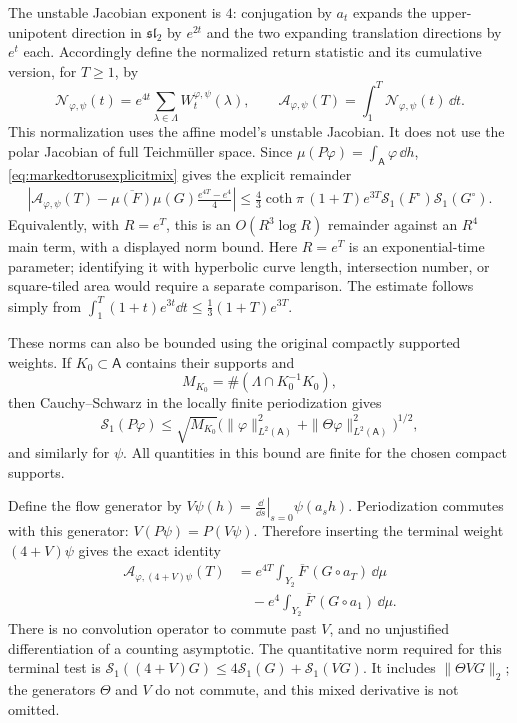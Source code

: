The unstable Jacobian exponent is $4$: conjugation by $a_t$
expands the upper-unipotent direction in $\mathfrak{sl}_2$ by
$e^{2t}$ and the two expanding translation directions by $e^t$
each. Accordingly define the normalized return statistic and its
cumulative version, for $T\geq1$, by
\[
 \mathcal N_{\varphi,\psi}(t)
   =e^{4t}\sum_{\lambda\in\Lambda}
                     W_t^{\varphi,\psi}(\lambda),\qquad
 \mathcal A_{\varphi,\psi}(T)
   =\int_1^T\mathcal N_{\varphi,\psi}(t)\,\dd t.
\]
This normalization uses the affine model's unstable Jacobian. It
does not use the polar Jacobian of full Teichm\"uller space.
Since $\mu(P\varphi)=\int_{\mathsf A}\varphi\,\dd h$,
\eqref{eq:markedtorusexplicitmix} gives the explicit remainder
\begin{equation}
 \begin{split}
 \left|\mathcal A_{\varphi,\psi}(T)
    -\overline{\mu(F)}\mu(G)\frac{e^{4T}-e^4}{4}\right|
 \leq\frac43\coth\pi\,(1+T)e^{3T}
       \mathcal S_1(F^\circ)\mathcal S_1(G^\circ).
 \end{split}
 \label{eq:markedtoruscountremainder}
\end{equation}
Equivalently, with $R=e^T$, this is an $O(R^3\log R)$
remainder against an $R^4$ main term, with a displayed norm bound.
Here $R=e^T$ is an exponential-time parameter; identifying it with
hyperbolic curve length, intersection number, or square-tiled area
would require a separate comparison. The estimate follows simply from
$\int_1^T(1+t)e^{3t}\dd t\leq\tfrac13(1+T)e^{3T}$.

These norms can also be bounded using the original compactly
supported weights. If $K_0\subset \mathsf A$ contains their supports and
\[
 M_{K_0}=\#(\Lambda\cap K_0^{-1}K_0),
\]
then Cauchy--Schwarz in the locally finite periodization gives
\[
 \mathcal S_1(P\varphi)
  \leq\sqrt{M_{K_0}}
       \bigl(\|\varphi\|_{L^2(\mathsf A)}^2+
              \|\Theta\varphi\|_{L^2(\mathsf A)}^2\bigr)^{1/2},
\]
and similarly for $\psi$. All quantities in this bound are finite
for the chosen compact supports.

Define the flow generator by
$V\psi(h)=\left.\frac{\dd}{\dd s}\right|_{s=0}\psi(a_sh)$.
Periodization commutes with this generator:
$V(P\psi)=P(V\psi)$. Therefore inserting the terminal weight
$(4+V)\psi$ gives the exact identity
\begin{equation}
 \begin{split}
 \mathcal A_{\varphi,(4+V)\psi}(T)
  &=e^{4T}\int_{Y_2}\overline F\,(G\circ a_T)\,\dd\mu\\
  &\quad-e^4\int_{Y_2}\overline F\,(G\circ a_1)\,\dd\mu.
 \end{split}
 \label{eq:markedtorusderivativeweight}
\end{equation}
There is no convolution operator to commute past $V$, and no
unjustified differentiation of a counting asymptotic.
The quantitative norm required for this terminal test is
$\mathcal S_1((4+V)G)\leq4\mathcal S_1(G)+\mathcal S_1(VG)$.
It includes $\|\Theta VG\|_2$; the generators $\Theta$ and $V$
do not commute, and this mixed derivative is not omitted.


